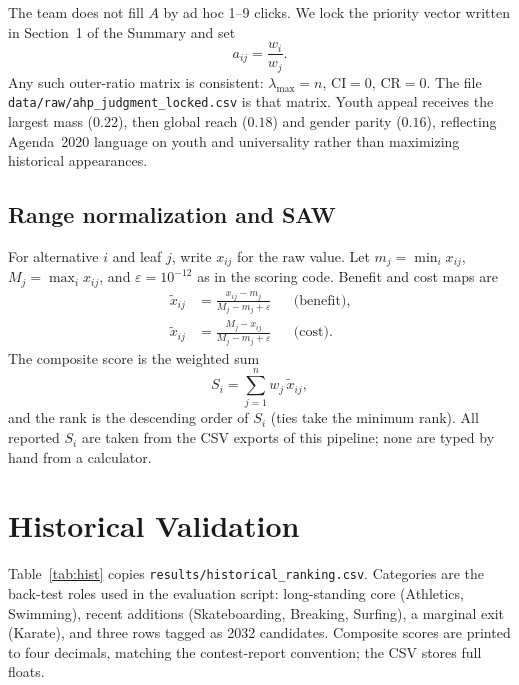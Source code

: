 \documentclass[12pt]{article}
\newcommand{\Teps}{\varepsilon}
\newcommand{\CR}{\mathrm{CR}}
\newcommand{\CI}{\mathrm{CI}}
\begin{document}
The team does not fill \(A\) by ad hoc 1--9 clicks. We lock the priority vector
written in Section~1 of the Summary and set
\begin{equation}
  a_{ij}=\frac{w_i}{w_j}.
\end{equation}
Any such outer-ratio matrix is consistent: \(\lambda_{\max}=n\), \(\CI=0\),
\(\CR=0\). The file \texttt{data/raw/ahp\_judgment\_locked.csv} is that matrix.
Youth appeal receives the largest mass (\(0.22\)), then global reach (\(0.18\)) and
gender parity (\(0.16\)), reflecting Agenda~2020 language on youth and universality
rather than maximizing historical appearances.

\subsection{Range normalization and SAW}

For alternative \(i\) and leaf \(j\), write \(x_{ij}\) for the raw value. Let
\(m_j=\min_i x_{ij}\), \(M_j=\max_i x_{ij}\), and \(\Teps=10^{-12}\) as in the scoring
code. Benefit and cost maps are
\begin{align}
  \tilde x_{ij}
  &=
  \frac{x_{ij}-m_j}{M_j-m_j+\Teps}
  && \text{(benefit)},
  \\
  \tilde x_{ij}
  &=
  \frac{M_j-x_{ij}}{M_j-m_j+\Teps}
  && \text{(cost)}.
\end{align}
The composite score is the weighted sum
\begin{equation}
  S_i=\sum_{j=1}^{n} w_j\,\tilde x_{ij},
\end{equation}
and the rank is the descending order of \(S_i\) (ties take the minimum rank).
All reported \(S_i\) are taken from the CSV exports of this pipeline; none are typed
by hand from a calculator.

\section{Historical Validation}
\label{sec:hist}

Table~\ref{tab:hist} copies \texttt{results/historical\_ranking.csv}. Categories are
the back-test roles used in the evaluation script: long-standing core (Athletics,
Swimming), recent additions (Skateboarding, Breaking, Surfing), a marginal exit
(Karate), and three rows tagged as 2032 candidates. Composite scores are printed to
four decimals, matching the contest-report convention; the CSV stores full floats.
\end{document}
